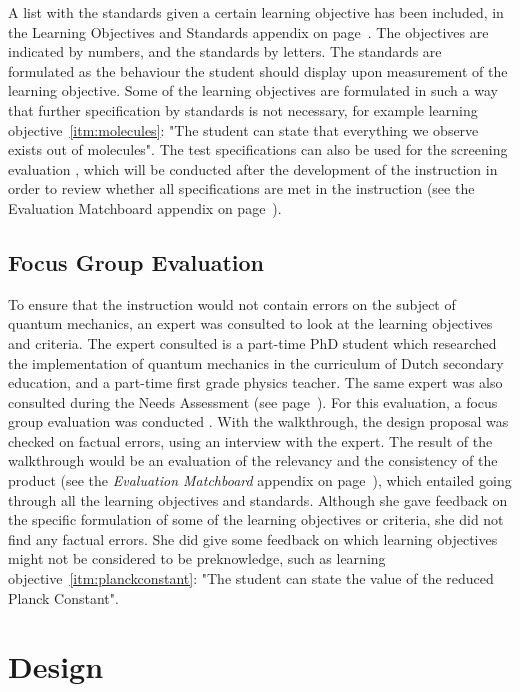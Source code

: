 \documentclass[11pt,twoside]{report} %
\begin{document}
A list with the standards given a certain learning objective has been included, in the Learning Objectives and Standards appendix on page~\pageref{app:objectivestandards}. The objectives are indicated by numbers, and the standards by letters. The standards are formulated as the behaviour the student should display upon measurement of the learning objective. Some of the learning objectives are formulated in such a way that further specification by standards is not necessary, for example learning objective~\ref{itm:molecules}: "The student can state that everything we observe exists out of molecules". The test specifications can also be used for the screening evaluation \cite{evamatchboard}, which will be conducted after the development of the instruction in order to review whether all specifications are met in the instruction (see the Evaluation Matchboard appendix on page~\pageref{app:evamatchboard}).

\section{Focus Group Evaluation}
\label{ch:focusgroup}

To ensure that the instruction would not contain errors on the subject of quantum mechanics, an expert was consulted to look at the learning objectives and criteria. The expert consulted is a part-time PhD student which researched the implementation of quantum mechanics in the curriculum of Dutch secondary education, and a part-time first grade physics teacher. The same expert was also consulted during the Needs Assessment (see page~\pageref{sssec:problem}). For this evaluation, a focus group evaluation was conducted \cite{evamatchboard}. With the walkthrough, the design proposal was checked on factual errors, using an interview with the expert. The result of the walkthrough would be an evaluation of the relevancy and the consistency of the product (see the \emph{Evaluation Matchboard} appendix on page~\pageref{app:evamatchboard}), which entailed going through all the learning objectives and standards. Although she gave  feedback on the specific formulation of some of the learning objectives or criteria, she did not find any factual errors. She did give some feedback on which learning objectives might not be considered to be preknowledge, such as learning objective~\ref{itm:planckconstant}: "The student can state the value of the reduced Planck Constant".


\chapter{Design}
\thispagestyle{fancy}
\end{document}
